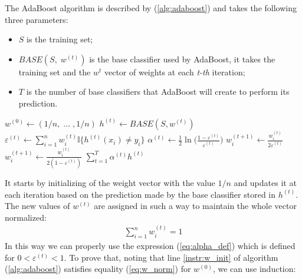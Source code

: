 The AdaBoost algorithm is described by (\ref{alg:adaboost}) and takes the following three parameters:
\begin{itemize}
	\item $S$ is the training set;
	\item $BASE(S,\;w^{(t)})$ is the base classifier used by AdaBoost, it takes the training set and the $w^{t}$ vector of weights at each \textit{t-th} iteration;
	\item $T$ is the number of base classifiers that AdaBoost will create to perform its prediction.
\end{itemize}
\begin{algorithm}[htpb]
	\caption{}
	\label{alg:adaboost}
	\begin{algorithmic}[1]
		\State $w^{(0)} \gets (1/n,\;\dots\;,1/n)$ \label{instr:w_init}
			\State $h^{(t)} \gets BASE(S, w^{(t)})$
			\State $\varepsilon^{(t)} \gets \sum_{i=1}^{n}w_{i}^{(t)}\mathbb{I}\lbrace h^{(t)}(x_{i}) \neq y_{i} \rbrace $
			\State $\alpha^{(t)} \gets \frac{1}{2}\ln\Big(\frac{1-\varepsilon^{(t)}}{\varepsilon^{(t)}}\Big)$
					\State $w_{i}^{(t+1)}\gets\frac{w_{i}^{(t)}}{2\varepsilon^{(t)}}$
				\Else
					\State $w_{i}^{(t+1)}\gets\frac{w_{i}^{(t)}}{2(1-\varepsilon^{(t)})}$
				\EndIf
			\EndFor
		\EndFor
		\Return $\sum_{t=1}^{T}\alpha^{(t)}h^{(t)}$
		\EndProcedure
	\end{algorithmic}
\end{algorithm}
It starts by initializing of the weight vector with the value $1/n$ and updates it at each iteration based on the prediction made by the base classifier stored in $h^{(t)}$. The new values of $w^{(t)}$ are assigned in such a way to maintain the whole vector normalized:
\begin{align}
	\label{eq:w_norm}
	\sum_{i=1}^{n}w^{(t)}_{i} = 1
\end{align}
In this way we can properly use the expression (\ref{eq:alpha_def}) which is defined for $0 < \varepsilon^{(t)} < 1$.
To prove that, noting that line \ref{instr:w_init} of algorithm (\ref{alg:adaboost}) satisfies equality (\ref{eq:w_norm}) for $w^{(0)}$, we can use induction:

